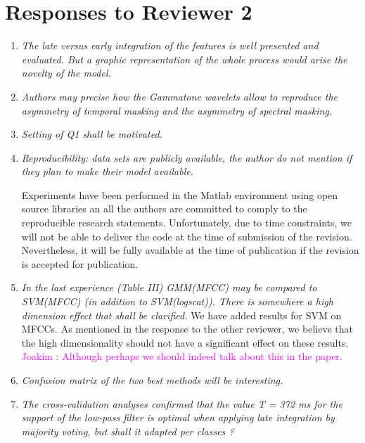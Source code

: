 \documentclass[10pt]{article}
\newcommand{\ja}[1]{\textcolor{magenta}{Joakim : #1}}
\begin{document}
\section{Responses to Reviewer 2}

\begin{enumerate}

\item \emph{The late versus early integration of the features is well presented and evaluated. But a graphic representation of the whole process would arise the novelty of the model.}

\item \emph{Authors may precise  how the Gammatone wavelets allow to reproduce the asymmetry of temporal masking and the asymmetry of spectral masking.}

\item \emph{Setting of Q1 shall be motivated.}

\item \emph{Reproducibility:  data sets are publicly available, the author do not mention if they plan to make their model available.}

Experiments have been performed in the Matlab environment using open source libraries an all the authors are committed to comply to the reproducible research statements. Unfortunately, due to time constraints, we will not be able to deliver the code at the time of submission of the revision. Nevertheless, it will be fully available at the time of publication if the revision is accepted for publication.

\item \emph{In the last experience (Table III) GMM(MFCC) may be compared to SVM(MFCC) (in addition to SVM(logscat)). There is somewhere a high dimension effect that shall be clarified.}
We have added results for SVM on MFCCs. As mentioned in the response to the other reviewer, we believe that the high dimensionality should not have a significant effect on these results. \ja{Although perhaps we should indeed talk about this in the paper.}

\item \emph{Confusion matrix of the two best methods will be interesting.}

\item \emph{The cross-validation analyses confirmed that the value T = 372 ms for the support of the low-pass filter is optimal when applying late integration by majority voting, but shall it adapted per classes  ?}


\end{enumerate}
\end{document}
